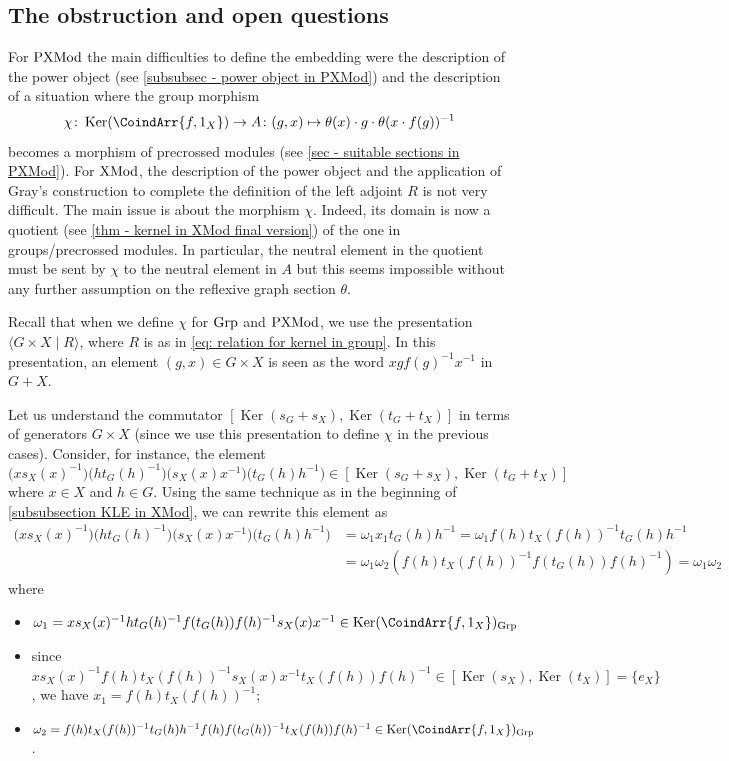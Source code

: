 \documentclass[a4paper, british, reqno]{amsart}
\newcommand*{\mapping}{\colon}
\DeclareMathOperator{\Ker}{Ker} %
\renewcommand*{\and}{,}
\renewcommand*{\and}{,}
\newcommand*{\CatName}[1]{\textnormal{#1}}
\newcommand*{\Grp}{\CatName{Grp}}
\newcommand*{\PXMod}{\CatName{PXMod}}
\newcommand*{\XMod}{\CatName{XMod}}
\theoremstyle{definition}
\theoremstyle{remark}
\begin{document}
\subsection{The obstruction and open questions}\label{sec - chi problem with XMod}
For \(\PXMod\) the main difficulties to define the embedding were the description of the power object (see \cref{subsubsec - power object in PXMod}) and the description of a situation where the group morphism
\[\chi\colon \Ker(\CoindArr{f\and 1_X})\to A \mapping (g,x)\mapsto \theta(x)\cdot g\cdot \theta(x\cdot f(g))^{-1}\]
becomes a morphism of precrossed modules (see \cref{sec - suitable sections in PXMod}). For \(\XMod\), the description of the power object and the application of Gray's construction to complete the definition of the left adjoint \(R\) is not very difficult. The main issue is about the morphism \(\chi\). Indeed, its domain is now a quotient (see \cref{thm - kernel in XMod final version}) of the one in groups/precrossed modules. In particular, the neutral element in the quotient must be sent by \(\chi\) to the neutral element in \(A\) but this seems impossible without any further assumption on the reflexive graph section \(\theta\).

Recall that when we define \(\chi\) for \(\Grp\) and \(\PXMod\), we use the presentation \(\langle G\times X\mid R\rangle\), where \(R\) is as in \eqref{eq: relation for kernel in group}. In this presentation, an element \((g,x)\in G\times X\) is seen as the word \(xgf(g)^{-1}x^{-1}\) in \(G+X\).

Let us understand the commutator \([\Ker(s_G+ s_X) , \Ker(t_G+ t_X)]\) in terms of generators \(G\times X\) (since we use this presentation to define \(\chi\) in the previous cases). Consider, for instance, the element
\begin{equation*}
	\bigl(xs_X(x)^{-1}\bigr)\bigl(ht_G(h)^{-1}\bigr)\bigl(s_X(x)x^{-1}\bigr) \bigl(t_G(h)h^{-1}\bigr)\in [\Ker(s_G+ s_X) , \Ker(t_G+ t_X)]
\end{equation*}
where \(x\in X\) and \(h\in G\). Using the same technique as in the beginning of \cref{subsubsection KLE in XMod}, we can rewrite this element as
\begin{align*}
	\bigl(xs_X(x)^{-1}\bigr)\bigl(ht_G(h)^{-1}\bigr)\bigl(s_X(x)x^{-1}\bigr) \bigl(t_G(h)h^{-1}\bigr) & =\omega_1 x_1 t_G(h)h^{-1}=\omega_1 f(h)t_X(f(h))^{-1}t_G(h)h^{-1}                       \\
	                                                                                                  & =\omega_1\omega_2 \left(f(h)t_X(f(h))^{-1}f(t_G(h))f(h)^{-1}\right)    =\omega_1\omega_2
\end{align*}
where
\begin{itemize}
	\item \(\omega_1=xs_X(x)^{-1}ht_G(h)^{-1}f(t_G(h))f(h)^{-1}s_X(x)x^{-1}\in \Ker(\CoindArr{f\and 1_X})_{\Grp}\)
	\item since \(xs_X(x)^{-1}f(h)t_X(f(h))^{-1}s_X(x)x^{-1}t_X(f(h))f(h)^{-1}\in[\Ker(s_X),\Ker(t_X)]=\{e_X\}\), we have \(x_1=f(h)t_X(f(h))^{-1}\);
	\item \(\omega_2=f(h)t_X(f(h))^{-1}t_G(h)h^{-1}f(h)f(t_G(h))^{-1}t_X(f(h))f(h)^{-1}\in \Ker(\CoindArr{f\and 1_X})_{\Grp}\).
\end{itemize}
\end{document}
